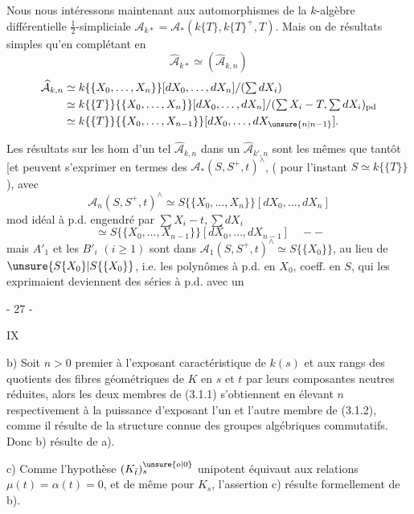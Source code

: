 Nous nous intéressons maintenant aux automorphismes de la $k$-algèbre différentielle
$\tfrac12$-simpliciale $\mathcal A_{k*}=\mathcal A_*(k\{T\},k\{T\}^+,T)$.
Mais on  de résultats simples qu'en complétant en
\[
 \widehat{\mathcal A}_{k*}\simeq(\widehat{\mathcal A}_{k,n})
\]
\[
 \begin{aligned}
 \widehat{\mathcal A}_{k,n}&\simeq k\{\{X_0,\ldots,X_n\}\}[dX_0,\ldots,dX_n]/(\textstyle\sum dX_i)\\
 &\simeq k\{\{T\}\}\{\{X_0,\ldots,X_n\}\}[dX_0,\ldots,dX_n]/
 (\textstyle\sum X_i-T,\sum dX_i)_{\mathrm{pd}}\\
 &\simeq k\{\{T\}\}\{\{X_0,\ldots,X_{n-1}\}\}[dX_0,\ldots,dX_{\unsure{n|n-1}}].
 \end{aligned}
\]

Les résultats sur les hom d'un tel $\widehat{\mathcal A}_{k,n}$ dans un
$\widehat{\mathcal A}_{k',n}$ sont les mêmes que tantôt [et peuvent s'exprimer en termes des
$\mathcal A_*(S,S^+,t)^\wedge$, ( pour l'instant $S\simeq k\{\{T\}\}$),
avec
\[
 \mathcal A_n(S,S^+,t)^\wedge\simeq S\{\{X_0,\ldots,X_n\}\}[dX_0,\ldots,dX_n]
\]
mod idéal à p.d. engendré par $\sum X_i-t,\sum dX_i$
\[
 \simeq S\{\{X_0,\ldots,X_{n-1}\}\}[dX_0,\ldots,dX_{n-1}]\quad--
\]
mais $A'_1$ et les $B'_i$ $(i\geq1)$ sont dans
$\mathcal A_1(S,S^+,t)^\wedge\simeq S\{\{X_0\}\}$, au lieu de
$\unsure{S\{X_0\}|S\{\{X_0\}}$, i.e. les polynômes à p.d.
en $X_0$, coeff. en $S$, qui les exprimaient deviennent des séries à p.d. avec un
\begin{center}- 27 -\end{center}\hfill IX

b) Soit $n>0$ premier à l'exposant caractéristique de $k(s)$
et aux rangs des quotients des fibres géométriques de $K$ en $s$ et $t$
par leurs composantes neutres réduites, alors les deux membres de
(3.1.1) s'obtiennent en élevant $n$ respectivement à la puissance
d'exposant l'un et l'autre membre de (3.1.2), comme il résulte de la
structure connue des groupes algébriques commutatifs. Donc b) résulte de a).

c) Comme l'hypothèse $(K_{\bar t})^{\unsure{o|0}}_s$ unipotent équivaut aux relations
$\mu(t)=\alpha(t)=0$, et de même pour $K_s$, l'assertion c) résulte formellement
de b).

